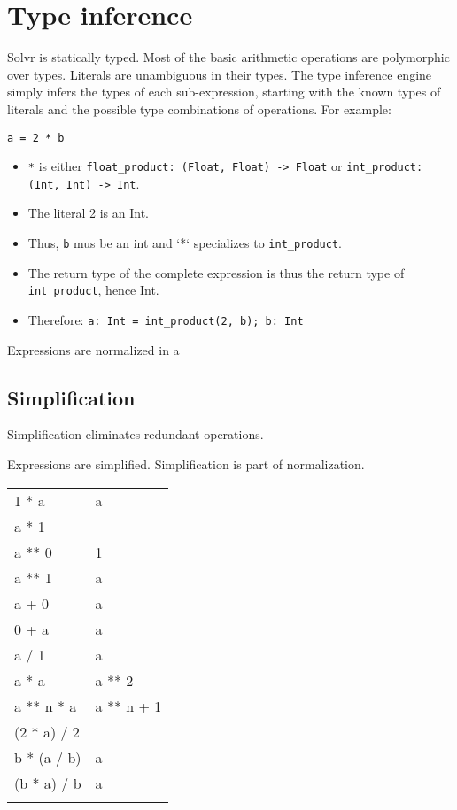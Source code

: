 \documentclass[11pt]{article}
\begin{document}
\section{Type inference}
\label{sec:org5775a2b}

Solvr is statically typed.  Most of the basic arithmetic operations
are polymorphic over types.  Literals are unambiguous in their types.
The type inference engine simply infers the types of each
sub-expression, starting with the known types of literals and the
possible type combinations of operations.  For example:

\begin{verbatim}
a = 2 * b
\end{verbatim}

\begin{itemize}
\item \texttt{*} is either \texttt{float\_product: (Float, Float) -> Float} or  \texttt{int\_product: (Int, Int) -> Int}.
\item The literal 2 is an Int.
\item Thus, \texttt{b} mus be an int and `*` specializes to \texttt{int\_product}.
\item The return type of the complete expression is thus the return type of \texttt{int\_product}, hence Int.
\item Therefore: \texttt{a: Int = int\_product(2, b); b: Int}
\end{itemize}

Expressions are normalized in a
\subsection{Simplification}
\label{sec:orgbcd82e2}

Simplification eliminates redundant operations.

Expressions are simplified.  Simplification is part of normalization.

\begin{center}
\begin{tabular}{ll}
1 * a & a\\
a * 1 & \\
a ** 0 & 1\\
a ** 1 & a\\
a + 0 & a\\
0 + a & a\\
a / 1 & a\\
a * a & a ** 2\\
a ** n * a & a ** n + 1\\
(2 * a) / 2 & \\
b * (a / b) & a\\
(b * a) / b & a\\
 & \\
\end{tabular}
\end{center}
\end{document}
